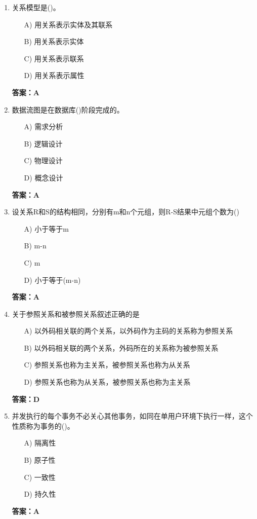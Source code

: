 \documentclass[a4paper,12pt]{article}
\begin{document}
\begin{enumerate}[label=\arabic*.]
\item 关系模型是()。
\begin{itemize}
    \item[A)] 用关系表示实体及其联系
    \item[B)] 用关系表示实体
    \item[C)] 用关系表示联系
    \item[D)] 用关系表示属性
\end{itemize}
\textbf{答案：A}

\item 数据流图是在数据库()阶段完成的。
\begin{itemize}
    \item[A)] 需求分析
    \item[B)] 逻辑设计
    \item[C)] 物理设计
    \item[D)] 概念设计
\end{itemize}
\textbf{答案：A}

\item 设关系R和S的结构相同，分别有m和n个元组，则R-S结果中元组个数为()
\begin{itemize}
    \item[A)] 小于等于m
    \item[B)] m-n
    \item[C)] m
    \item[D)] 小于等于(m-n)
\end{itemize}
\textbf{答案：A}

\item 关于参照关系和被参照关系叙述正确的是
\begin{itemize}
    \item[A)] 以外码相关联的两个关系，以外码作为主码的关系称为参照关系
    \item[B)] 以外码相关联的两个关系，外码所在的关系称为被参照关系
    \item[C)] 参照关系也称为主关系，被参照关系也称为从关系
    \item[D)] 参照关系也称为从关系，被参照关系也称为主关系
\end{itemize}
\textbf{答案：D}

\item 并发执行的每个事务不必关心其他事务，如同在单用户环境下执行一样，这个性质称为事务的()。
\begin{itemize}
    \item[A)] 隔离性
    \item[B)] 原子性
    \item[C)] 一致性
    \item[D)] 持久性
\end{itemize}
\textbf{答案：A}


\end{enumerate}
\end{document}
